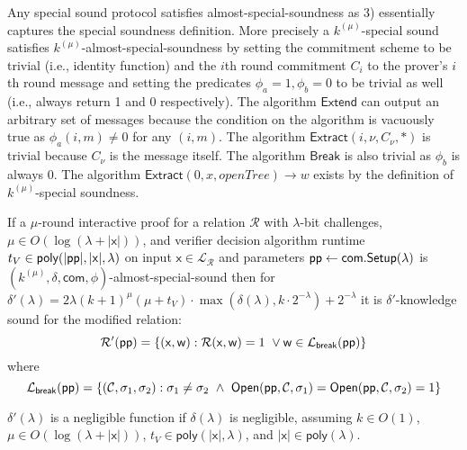 \begin{remark} Any special sound protocol satisfies almost-special-soundness as 3) essentially captures the special soundness definition. More precisely a $k^{(\mu)}$-special sound satisfies $k^{(\mu)}$-almost-special-soundness by setting the commitment scheme to be trivial (i.e., identity function) and the $i$th round commitment $C_i$ to the prover's $i$th round message and setting the predicates $\phi_a=1, \phi_b=0$ to be trivial as well (i.e., always return 1 and 0 respectively). The algorithm $\textsf{Extend}$ can output an arbitrary set of messages because the condition on the algorithm is vacuously true as $\phi_a(i,m) \neq 0$ for any $(i,m)$. The algorithm $\textsf{Extract}(i, \nu, C_\nu, *)$ is trivial because $C_\nu$ is the message itself. The algorithm $\textsf{Break}$ is also trivial as $\phi_b$ is always $0$. The algorithm $\textsf{Extract}(0, x, openTree) \rightarrow w$ exists by the definition of $k^{(\mu)}$-special soundness. %
\end{remark}



\begin{theorem}\label{thm:DARKExtractor} If a $\mu$-round interactive proof for a relation $\mathcal{R}$ with $\lambda$-bit challenges, $\mu \in O(\log(\lambda + |\mathsf{x}|))$, and verifier decision algorithm runtime $t_V \in \textsf{poly}(|\textsf{pp}|, |\mathsf{x}|, \lambda)$ on input $\mathsf{x} \in \mathcal{L}_\mathcal{R}$ and parameters $\textsf{pp} \gets \textsf{com}.\textsf{{Setup}}(\lambda)$ is $(k^{(\mu)}, \delta, \textsf{com}, \phi)$-almost-special-sound then for $\delta'(\lambda) = 2\lambda (k+1)^\mu (\mu + t_V) \cdot \max(\delta(\lambda), k \cdot 2^{-\lambda}) + 2^{-\lambda}$ it is $\delta'$-knowledge sound for the modified relation:
$$\mathcal{R'}(\textsf{pp}) = \{(\mathsf{x}, \mathsf{w}): \mathcal{R}(\mathsf{x}, \mathsf{w}) = 1 \  \vee \mathsf{w} \in \mathcal{L}_\textsf{break}(\textsf{pp})\} $$
 where 
 $$\mathcal{L}_\textsf{break}(\crs) = \{ (\mathcal{C}, \sigma_1, \sigma_2) :   \sigma_1 \neq \sigma_2 \ \wedge \ \open(\crs,\mathcal{C}, \sigma_1) = \open(\crs,\mathcal{C}, \sigma_2) = 1    \} $$ 

\end{theorem} 
\begin{remark} $\delta'(\lambda)$ is a negligible function if $\delta(\lambda)$ is negligible, assuming $k \in O(1)$, $\mu \in O(\log(\lambda + |\mathsf{x}|))$, $t_V \in \textsf{poly}(|\mathsf{x}|, \lambda)$, and $|\mathsf{x}| \in \textsf{poly}(\lambda)$. 	
\end{remark}

